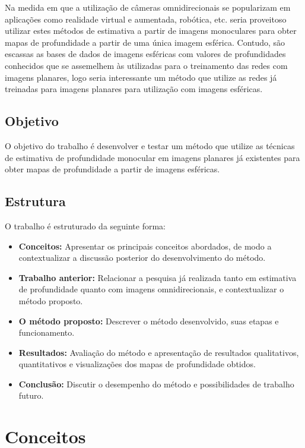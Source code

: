 \documentclass[cic,tc]{iiufrgs}
\begin{document}
Na medida em que a utilização de câmeras omnidirecionais se popularizam em aplicações como realidade virtual e aumentada, robótica, etc. seria proveitoso utilizar estes métodos de estimativa a partir de imagens monoculares para obter mapas de profundidade a partir de uma única imagem esférica. Contudo, são escassas as bases de dados de imagens esféricas com valores de profundidades conhecidos que se assemelhem às utilizadas para o treinamento das redes com imagens planares, logo seria interessante um método que utilize as redes já treinadas para imagens planares para utilização com imagens esféricas.

\section{Objetivo}

O objetivo do trabalho é desenvolver e testar um método que utilize as técnicas de estimativa de profundidade monocular em imagens planares já existentes para obter mapas de profundidade a partir de imagens esféricas.

\section{Estrutura}

O trabalho é estruturado da seguinte forma:

\begin{itemize}
\item \textbf{Conceitos:} Apresentar os principais conceitos abordados, de modo a contextualizar a discussão posterior do desenvolvimento do método.
\item \textbf{Trabalho anterior:} Relacionar a pesquisa já realizada tanto em estimativa de profundidade quanto com imagens omnidirecionais, e contextualizar o método proposto.
\item \textbf{O método proposto:} Descrever o método desenvolvido, suas etapas e funcionamento.
\item \textbf{Resultados:} Avaliação do método e apresentação de resultados qualitativos, quantitativos e visualizações dos mapas de profundidade obtidos.
\item \textbf{Conclusão:} Discutir o desempenho do método e possibilidades de trabalho futuro.
\end{itemize}

\chapter{Conceitos}
\end{document}

